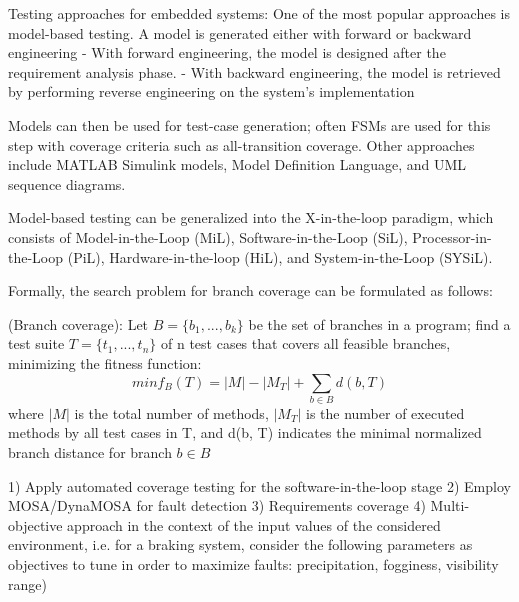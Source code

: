 Testing approaches for embedded systems:
One of the most popular approaches is model-based testing. A model is generated either with forward or backward engineering
	- With forward engineering, the model is designed after the requirement analysis phase.
	- With backward engineering, the model is retrieved by performing reverse engineering on the system's implementation

Models can then be used for test-case generation; often FSMs are used for this step with coverage criteria such as all-transition coverage. Other approaches include MATLAB Simulink models, Model Definition Language, and UML sequence diagrams.

Model-based testing can be generalized into the X-in-the-loop paradigm, which consists of Model-in-the-Loop (MiL), Software-in-the-Loop (SiL), Processor-in-the-Loop (PiL), Hardware-in-the-loop (HiL), and System-in-the-Loop (SYSiL).



Formally, the search problem for branch coverage can be formulated as follows:

\begin{problem}(Branch coverage):
    Let $ B = \{b_1,...,b_k\} $ be the set of branches in a program; find a test suite $ T = \{t_1,...,t_n \} $ of n test cases that covers all feasible branches, minimizing the fitness function:
    \begin{equation}
        min f_B (T) = |M| - |M_T| + \sum_{b \in B} d(b, T)
    \end{equation}
    where $|M|$ is the total number of methods, $|M_T|$ is the number of executed methods by all test cases in T, and d(b, T) indicates the minimal normalized branch distance for branch $ b \in B $
\end{problem}



1) Apply automated coverage testing for the software-in-the-loop stage
2) Employ MOSA/DynaMOSA for fault detection
3) Requirements coverage
4) Multi-objective approach in the context of the input values of the considered environment, i.e. for a braking system, consider the following parameters as objectives to tune in order to maximize faults: precipitation, fogginess, visibility range)


